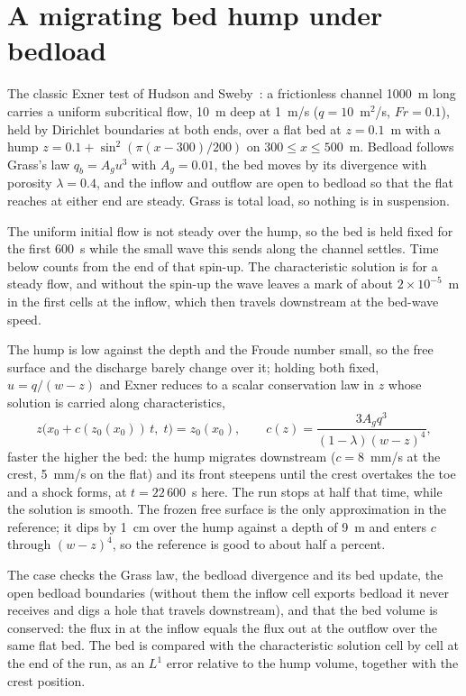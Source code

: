
\section{A migrating bed hump under bedload}

The classic Exner test of Hudson and Sweby~\cite{HudsonSweby2003}: a
frictionless channel 1000~m long carries a uniform subcritical flow,
10~m deep at 1~m/s ($q = 10$~m$^2$/s, $Fr = 0.1$), held by Dirichlet
boundaries at both ends, over a flat bed at $z = 0.1$~m with a hump
$z = 0.1 + \sin^2(\pi(x-300)/200)$ on $300 \le x \le 500$~m. Bedload
follows Grass's law $q_b = A_g u^3$ with $A_g = 0.01$, the bed moves by its
divergence with porosity $\lambda = 0.4$, and the inflow and outflow are
open to bedload so that the flat reaches at either end are steady. Grass is
total load, so nothing is in suspension.

The uniform initial flow is not steady over the hump, so the bed is held fixed
for the first 600~s while the small wave this sends along the channel settles.
Time below counts from the end of that spin-up. The characteristic solution is
for a steady flow, and without the spin-up the wave leaves a mark of about
$2\times10^{-5}$~m in the first cells at the inflow, which then travels
downstream at the bed-wave speed.

The hump is low against the depth and the Froude number small, so the free
surface and the discharge barely change over it; holding both fixed,
$u = q/(w - z)$ and Exner reduces to a scalar conservation law in $z$
whose solution is carried along characteristics,
\begin{equation}
z\big(x_0 + c(z_0(x_0))\, t,\; t\big) = z_0(x_0), \qquad
c(z) = \frac{3 A_g q^3}{(1-\lambda)(w - z)^4} ,
\end{equation}
faster the higher the bed: the hump migrates downstream ($c = 8$~mm/s at
the crest, 5~mm/s on the flat) and its front steepens until the crest
overtakes the toe and a shock forms, at $t = 22\,600$~s here. The run
stops at half that time, while the solution is smooth. The frozen free
surface is the only approximation in the reference; it dips by
1~cm over the hump against a depth of 9~m and enters $c$ through
$(w-z)^4$, so the reference is good to about half a percent.

The case checks the Grass law, the bedload divergence and its bed update,
the open bedload boundaries (without them the inflow cell exports bedload
it never receives and digs a hole that travels downstream), and that the
bed volume is conserved: the flux in at the inflow equals the flux out at
the outflow over the same flat bed. The bed is compared with the
characteristic solution cell by cell at the end of the run, as an $L^1$
error relative to the hump volume, together with the crest position.

